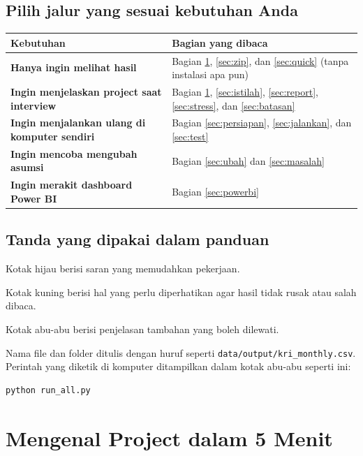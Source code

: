 \documentclass[11pt,a4paper]{article}
\newcommand{\file}[1]{\texttt{\small #1}}
\begin{document}
\subsection*{Pilih jalur yang sesuai kebutuhan Anda}

\begin{center}
\begin{tabularx}{\linewidth}{>{\bfseries}p{4.6cm}X}
\toprule
Kebutuhan & Bagian yang dibaca \\
\midrule
Hanya ingin melihat hasil & Bagian \ref{sec:overview}, \ref{sec:zip}, dan \ref{sec:quick} (tanpa instalasi apa pun) \\
Ingin menjelaskan project saat interview & Bagian \ref{sec:overview}, \ref{sec:istilah}, \ref{sec:report}, \ref{sec:stress}, dan \ref{sec:batasan} \\
Ingin menjalankan ulang di komputer sendiri & Bagian \ref{sec:persiapan}, \ref{sec:jalankan}, dan \ref{sec:test} \\
Ingin mencoba mengubah asumsi & Bagian \ref{sec:ubah} dan \ref{sec:masalah} \\
Ingin merakit dashboard Power BI & Bagian \ref{sec:powerbi} \\
\bottomrule
\end{tabularx}
\end{center}

\subsection*{Tanda yang dipakai dalam panduan}

\begin{tipbox}
Kotak hijau berisi saran yang memudahkan pekerjaan.
\end{tipbox}
\begin{warnbox}
Kotak kuning berisi hal yang perlu diperhatikan agar hasil tidak rusak atau salah dibaca.
\end{warnbox}
\begin{infobox}
Kotak abu-abu berisi penjelasan tambahan yang boleh dilewati.
\end{infobox}

Nama file dan folder ditulis dengan huruf seperti \file{data/output/kri\_\allowbreak{}monthly.csv}. Perintah yang diketik di komputer ditampilkan dalam kotak abu-abu seperti ini:
\begin{lstlisting}
python run_all.py
\end{lstlisting}

\section{Mengenal Project dalam 5 Menit}\label{sec:overview}
\end{document}

